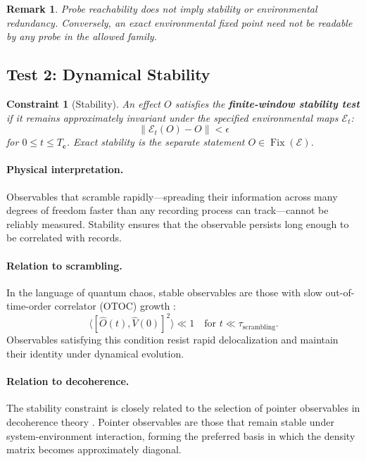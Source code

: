 \documentclass[12pt,a4paper,openany]{book}
\newtheorem{remark}[theorem]{Remark}
\newtheorem{constraint}[theorem]{Constraint}
\begin{document}
\begin{remark}
Probe reachability does not imply stability or environmental redundancy.  Conversely, an exact environmental fixed point need not be readable by any probe in the allowed family.
\end{remark}

\subsection{Test 2: Dynamical Stability}

\begin{constraint}[Stability]
\label{E-const:stability}
An effect $O$ satisfies the \textbf{finite-window stability test} if it remains approximately invariant under the specified environmental maps $\mathcal{E}_t$:
\begin{equation}
\|\mathcal{E}_t(O) - O\| < \epsilon
\end{equation}
for $0\le t\le T_{\mathbf c}$.  Exact stability is the separate statement $O\in\operatorname{Fix}(\mathcal E)$.
\end{constraint}

\paragraph{Physical interpretation.}
Observables that scramble rapidly---spreading their information across many degrees of freedom faster than any recording process can track---cannot be reliably measured. Stability ensures that the observable persists long enough to be correlated with records.

\paragraph{Relation to scrambling.}
In the language of quantum chaos, stable observables are those with slow out-of-time-order correlator (OTOC) growth \cite{Hayden2007}:
\begin{equation}
\langle [\hat{O}(t), \hat{V}(0)]^2 \rangle \ll 1 \quad \text{for } t \ll \tau_{\text{scrambling}}.
\end{equation}
Observables satisfying this condition resist rapid delocalization and maintain their identity under dynamical evolution.

\paragraph{Relation to decoherence.}
The stability constraint is closely related to the selection of pointer observables in decoherence theory \cite{Zurek2003}. Pointer observables are those that remain stable under system-environment interaction, forming the preferred basis in which the density matrix becomes approximately diagonal.
\end{document}
